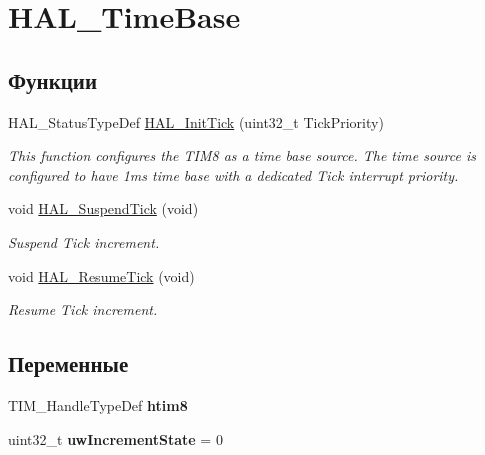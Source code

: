 \hypertarget{group___h_a_l___time_base}{
\section{HAL\_\-TimeBase}
\label{group___h_a_l___time_base}
}
\subsection*{Функции}
\begin{CompactItemize}
\item 
HAL\_\-StatusTypeDef \hyperlink{group___h_a_l___time_base_g879cdb21ef051eb81ec51c18147397d5}{HAL\_\-InitTick} (uint32\_\-t TickPriority)
\begin{CompactList}\small\item\em This function configures the TIM8 as a time base source. The time source is configured to have 1ms time base with a dedicated Tick interrupt priority. \item\end{CompactList}\item 
void \hyperlink{group___h_a_l___time_base_gaf651af2afe688a991c657f64f8fa5f9}{HAL\_\-SuspendTick} (void)
\begin{CompactList}\small\item\em Suspend Tick increment. \item\end{CompactList}\item 
void \hyperlink{group___h_a_l___time_base_g24e0ee9dae1ec0f9d19200f5575ff790}{HAL\_\-ResumeTick} (void)
\begin{CompactList}\small\item\em Resume Tick increment. \item\end{CompactList}\end{CompactItemize}
\subsection*{Переменные}
\begin{CompactItemize}
\item 
\hypertarget{group___h_a_l___time_base_g5faa27108379f799afb6984010bf0384}{
TIM\_\-HandleTypeDef \textbf{htim8}}
\label{group___h_a_l___time_base_g5faa27108379f799afb6984010bf0384}

\item 
\hypertarget{group___h_a_l___time_base_gd252e5fa14fe03797c816cfb14962693}{
uint32\_\-t \textbf{uwIncrementState} = 0}
\label{group___h_a_l___time_base_gd252e5fa14fe03797c816cfb14962693}

\end{CompactItemize}


